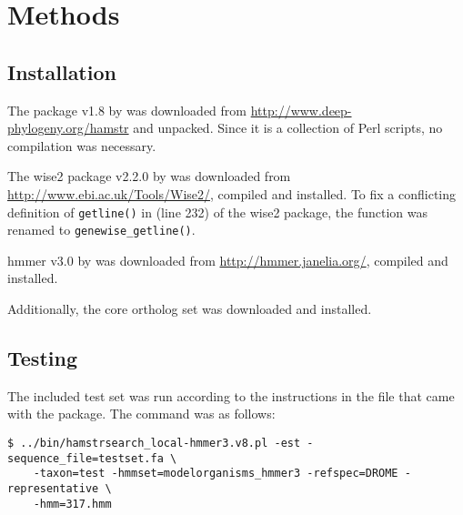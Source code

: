 \section{Methods}
\subsection{Installation}
The \hamstr package v1.8 by \cite{Ebersberger2009} was downloaded from \url{http://www.deep-phylogeny.org/hamstr} and unpacked. Since it is a collection of Perl scripts, no compilation was necessary.

The wise2 package v2.2.0 by \cite{Birney2004} was downloaded from \url{http://www.ebi.ac.uk/Tools/Wise2/}, compiled and installed. To fix a conflicting definition of \lstinline{getline()} in  (line 232) of the wise2 package, the function was renamed to \lstinline{genewise_getline()}. 

hmmer v3.0 by \cite{Eddy2009} was downloaded from \url{http://hmmer.janelia.org/}, compiled and installed.

Additionally, the  core ortholog set was downloaded and installed.

\subsection{Testing}
The included test set was run according to the instructions in the  file that came with the \hamstr package. The command was as follows:

\begin{verbatim}
$ ../bin/hamstrsearch_local-hmmer3.v8.pl -est -sequence_file=testset.fa \
	-taxon=test -hmmset=modelorganisms_hmmer3 -refspec=DROME -representative \
	-hmm=317.hmm
\end{verbatim}

